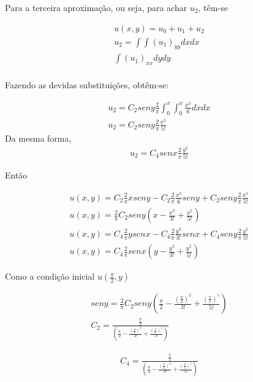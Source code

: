 Para a terceira aproximação, ou seja, para achar $u_{2}$, têm-se

\begin{gather}
u(x,y) = u_{0} + u_{1} + u_{2}\nonumber\\
u_{2} = \int \int(u_{1})_{yy}dxdx\nonumber\\
\int(u_{1})_{xx}dydy\nonumber\\
\end{gather}


Fazendo as devidas substituições, obtêm-se:

\begin{gather}
u_{2} = C_{2}seny\frac{2}{\pi}\int_0^x \int_0^x \frac{x^3}{6}dxdx\nonumber\\
u_{2} = C_{2}seny\frac{2}{\pi}\frac{x^5}{5!}
\end{gather}
Da mesma forma,
\begin{gather}
u_{2} = C_{4}senx\frac{2}{\pi}\frac{y^5}{5!}
\end{gather}

Então



\begin{gather}
u(x,y) = C_{2}\frac{2}{\pi}xseny - C_{2}\frac{2}{\pi}\frac{x^3}{6}seny + C_{2}seny\frac{2}{\pi}\frac{x^5}{5!}\nonumber\\
u(x,y) = \frac{2}{\pi}C_{2}seny\left(x - \frac{x^3}{3!} + \frac{x^5}{5!}\right)\nonumber\\
u(x,y) = C_{4}\frac{2}{\pi}ysenx - C_{4}\frac{2}{\pi}\frac{y^3}{3!}senx + C_{4}seny\frac{2}{\pi}\frac{y^5}{5!}\nonumber\\
u(x,y) = C_{4}\frac{2}{\pi}senx\left(y - \frac{y^3}{3!} + \frac{y^5}{5!}\right)
\end{gather}

Como a condição inicial $u\left(\frac{\pi}{2},y\right)$

\begin{gather}
seny = \frac{2}{\pi}C_{2}seny\left(\frac{\pi}{2}-\frac{(\frac{\pi}{2})^3}{3!} + \frac{(\frac{\pi}{5})^5}{5!}\right)\nonumber\\
C_{2} = \frac{\frac{\pi}{2}}{\left(\frac{\pi}{2}-\frac{(\frac{\pi}{2})^3}{3!} + \frac{(\frac{\pi}{5})^5}{5!}\right)}
\end{gather}

\begin{gather}
C_{4} = \frac{\frac{\pi}{2}}{\left(\frac{\pi}{2}-\frac{(\frac{\pi}{2})^3}{3!} + \frac{(\frac{\pi}{5})^5}{5!}\right)}
\end{gather}


